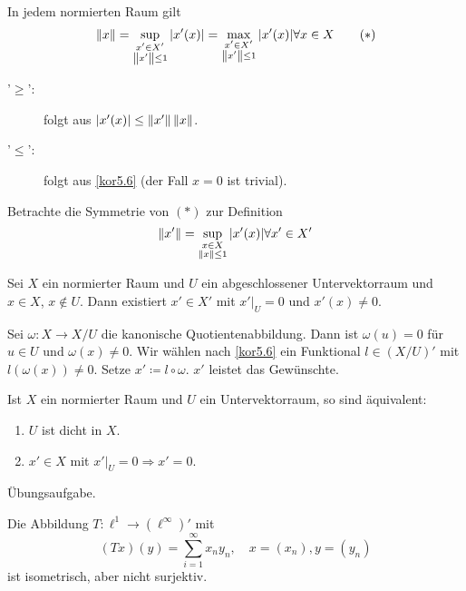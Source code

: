 \begin{korollar}
	In jedem normierten Raum gilt
	\[  \left\|x\right\|=\sup_{\substack{x'\in X'\\\left\|x'\right\|\leq 1}}|x'(x)|=\max_{\substack{x'\in X'\\\left\|x'\right\|\leq 1}}|x'(x)|\forall x\in X\qquad(\ast) \]
\end{korollar}
\begin{beweis}
	\begin{description}
		\item['$ \geq $':] folgt aus $ |x'(x)|\leq\left\|x'\right\|\left\|x\right\| $.
		\item['$ \leq $':] folgt aus \ref{kor5.6} (der Fall $ x=0 $ ist trivial). 
	\end{description}
\end{beweis}
\begin{bemerkung*}
	Betrachte die Symmetrie von $ (\ast) $ zur Definition
	\[ \left\|x'\right\|=\sup_{\substack{x\in X\\\left\|x\right\|\leq 1}}|x'(x)|\forall x'\in X' \]
\end{bemerkung*}
\begin{korollar}
	Sei $ X $ ein normierter Raum und $ U $ ein abgeschlossener Untervektorraum und $ x\in X $, $ x\notin U $. Dann existiert $ x'\in X' $ mit $ x'|_U=0 $ und $ x'(x)\neq 0 $. 
\end{korollar}
\begin{beweis}
	Sei $ \omega\colon X\rightarrow X/U $ die kanonische Quotientenabbildung. Dann ist $ \omega(u)=0 $ f\"ur $ u\in U $ und $ \omega(x)\neq 0 $. Wir w\"ahlen nach \ref{kor5.6} ein Funktional $ l\in(X/U)' $ mit $ l(\omega(x))\neq 0 $. Setze $ x'\coloneqq l\circ\omega $. $ x' $ leistet das Gew\"unschte.
\end{beweis}
\begin{korollar}
	Ist $ X $ ein normierter Raum und $ U $ ein Untervektorraum, so sind \"aquivalent:
	\begin{enumerate}
		\item $ U $ ist dicht in $ X $.
		\item $ x'\in X $ mit $ x'|_U=0\Rightarrow x'=0 $.
	\end{enumerate}
\end{korollar}
\begin{beweis}
	\"Ubungsaufgabe.
\end{beweis}
\begin{satz}
	Die Abbildung $ T\colon\ell^1\rightarrow(\ell^\infty)' $ mit
	\[ (Tx)(y)=\sum_{i=1}^{\infty}x_ny_n,\quad x=(x_n),y=(y_n) \]
	ist isometrisch, aber nicht surjektiv.
\end{satz}

